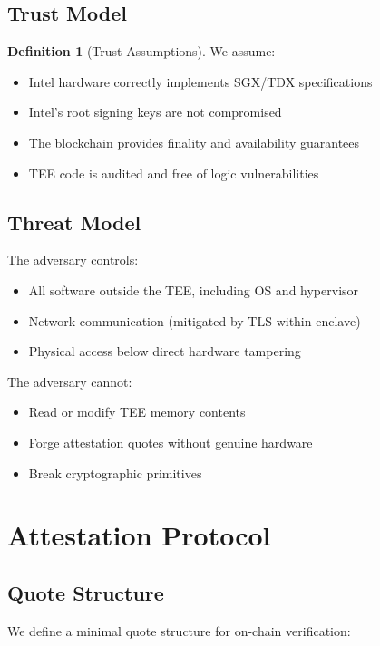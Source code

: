 \documentclass[11pt,a4paper]{article}
\theoremstyle{definition}
\newtheorem{definition}{Definition}
\begin{document}
\subsection{Trust Model}

\begin{definition}[Trust Assumptions]
We assume:
\begin{itemize}
    \item Intel hardware correctly implements SGX/TDX specifications
    \item Intel's root signing keys are not compromised
    \item The blockchain provides finality and availability guarantees
    \item TEE code is audited and free of logic vulnerabilities
\end{itemize}
\end{definition}

\subsection{Threat Model}

The adversary controls:
\begin{itemize}
    \item All software outside the TEE, including OS and hypervisor
    \item Network communication (mitigated by TLS within enclave)
    \item Physical access below direct hardware tampering
\end{itemize}

The adversary cannot:
\begin{itemize}
    \item Read or modify TEE memory contents
    \item Forge attestation quotes without genuine hardware
    \item Break cryptographic primitives
\end{itemize}

\section{Attestation Protocol}

\subsection{Quote Structure}

We define a minimal quote structure for on-chain verification:
\end{document}
